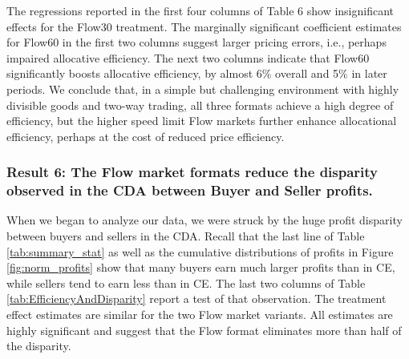 \documentclass[12pt]{article}
\begin{document}
The regressions reported in the first four columns of Table 6 show insignificant effects for the Flow30 treatment. The marginally significant coefficient estimates for Flow60 in the first two columns suggest larger pricing errors, i.e., perhaps impaired allocative efficiency. 
The next two columns indicate that Flow60 significantly boosts allocative efficiency, by almost 6\% overall and 5\% in later periods. 
We conclude that, in a simple but challenging environment with highly divisible goods and two-way trading, all three formats achieve a high degree of efficiency, but the higher speed limit Flow markets further enhance allocational efficiency, perhaps at the cost of reduced price efficiency. 

\subsubsection*{Result 6: The Flow market formats reduce the disparity observed in the CDA between Buyer and Seller profits.}

When we began to analyze our data, we were struck by the huge profit disparity between buyers and sellers
in the CDA. Recall that the last line of Table \ref{tab:summary_stat} as well as the cumulative distributions of profits in Figure \ref{fig:norm_profits} show that many buyers earn much larger profits than in CE, while sellers tend to earn less than in CE. 
The last two columns of Table \ref{tab:EfficiencyAndDisparity} report a test of that observation.
The treatment effect estimates are similar for the two Flow market variants.
All estimates are highly significant and suggest that 
the Flow format eliminates more than half of the disparity.
\end{document}
